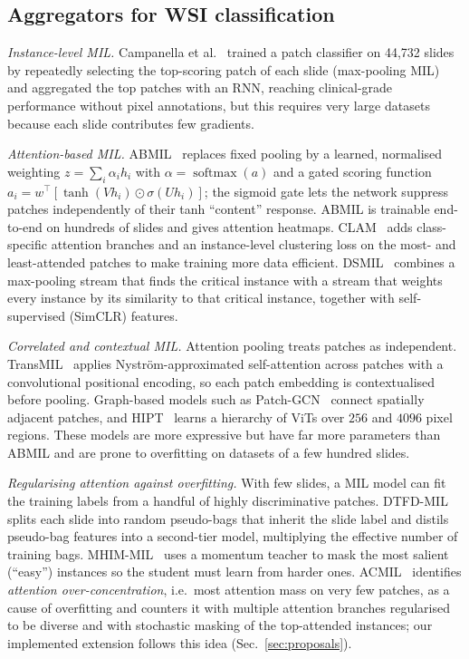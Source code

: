 \documentclass[conference]{IEEEtran}
\DeclareMathOperator{\softmax}{softmax}
\begin{document}
\subsection{Aggregators for WSI classification}
\emph{Instance-level MIL.} Campanella et al.~\cite{campanella2019} trained a patch classifier on 44{,}732 slides by repeatedly selecting the top-scoring patch of each slide (max-pooling MIL) and aggregated the top patches with an RNN, reaching clinical-grade performance without pixel annotations, but this requires very large datasets because each slide contributes few gradients.

\emph{Attention-based MIL.} ABMIL~\cite{ilse2018} replaces fixed pooling by a learned, normalised weighting $z=\sum_i \alpha_i h_i$ with $\alpha=\softmax(a)$ and a gated scoring function $a_i=w^\top[\tanh(Vh_i)\odot\sigma(Uh_i)]$; the sigmoid gate lets the network suppress patches independently of their tanh ``content'' response. ABMIL is trainable end-to-end on hundreds of slides and gives attention heatmaps. CLAM~\cite{lu2021clam} adds class-specific attention branches and an instance-level clustering loss on the most- and least-attended patches to make training more data efficient. DSMIL~\cite{li2021dsmil} combines a max-pooling stream that finds the critical instance with a stream that weights every instance by its similarity to that critical instance, together with self-supervised (SimCLR) features.

\emph{Correlated and contextual MIL.} Attention pooling treats patches as independent. TransMIL~\cite{shao2021transmil} applies Nystr\"om-approximated self-attention across patches with a convolutional positional encoding, so each patch embedding is contextualised before pooling. Graph-based models such as Patch-GCN~\cite{chen2021patchgcn} connect spatially adjacent patches, and HIPT~\cite{chen2022hipt} learns a hierarchy of ViTs over $256$ and $4096$ pixel regions. These models are more expressive but have far more parameters than ABMIL and are prone to overfitting on datasets of a few hundred slides.

\emph{Regularising attention against overfitting.} With few slides, a MIL model can fit the training labels from a handful of highly discriminative patches. DTFD-MIL~\cite{zhang2022dtfd} splits each slide into random pseudo-bags that inherit the slide label and distils pseudo-bag features into a second-tier model, multiplying the effective number of training bags. MHIM-MIL~\cite{tang2023mhim} uses a momentum teacher to mask the most salient (``easy'') instances so the student must learn from harder ones. ACMIL~\cite{zhang2024acmil} identifies \emph{attention over-concentration}, i.e.\ most attention mass on very few patches, as a cause of overfitting and counters it with multiple attention branches regularised to be diverse and with stochastic masking of the top-attended instances; our implemented extension follows this idea (Sec.~\ref{sec:proposals}).
\end{document}
